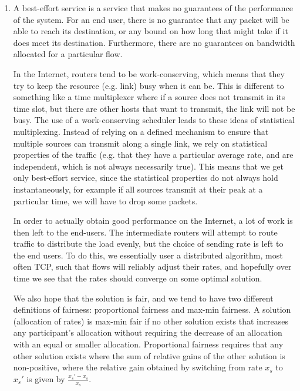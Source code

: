 


\begin{enumerate}[label=(\alph*)]
  \item
    A best-effort service is a service that makes no guarantees of the performance of the system. For an end user, there is no guarantee that any packet will be able to reach its destination, or any bound on how long that might take if it does meet its destination. Furthermore, there are no guarantees on bandwidth allocated for a particular flow.

    In the Internet, routers tend to be work-conserving, which means that they try to keep the resource (e.g. link) busy when it can be. This is different to something like a time multiplexer where if a source does not transmit in its time slot, but there are other hosts that want to transmit, the link will not be busy. The use of a work-conserving scheduler leads to these ideas of statistical multiplexing. Instead of relying on a defined mechanism to ensure that multiple sources can transmit along a single link, we rely on statistical properties of the traffic (e.g. that they have a particular average rate, and are independent, which is not always necessarily true). This means that we get only best-effort service, since the statistical properties do not always hold instantaneously, for example if all sources transmit at their peak at a particular time, we will have to drop some packets.

    In order to actually obtain good performance on the Internet, a lot of work is then left to the end-users. The intermediate routers will attempt to route traffic to distribute the load evenly, but the choice of sending rate is left to the end users. To do this, we essentially user a distributed algorithm, most often TCP, such that flows will reliably adjust their rates, and hopefully over time we see that the rates should converge on some optimal solution. 

    We also hope that the solution is fair, and we tend to have two different definitions of fairness: proportional fairness and max-min fairness. A solution (allocation of rates) is max-min fair if no other solution exists that increases any participant's allocation without requiring the decrease of an allocation with an equal or smaller allocation. Proportional fairness requires that any other solution exists where the sum of relative gains of the other solution is non-positive, where the relative gain obtained by switching from rate $x_s$ to $x_s'$ is given by $\frac{x_s' - x_s}{x_s}$.


\end{enumerate}
